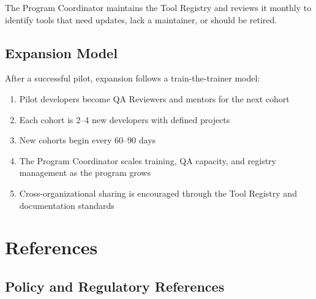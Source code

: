 \documentclass[11pt,letterpaper]{article}
\begin{document}
The Program Coordinator maintains the Tool Registry and reviews it monthly to identify
tools that need updates, lack a maintainer, or should be retired.

\subsection{Expansion Model}
\label{sec:expansion-model}

After a successful pilot, expansion follows a train-the-trainer model:

\begin{enumerate}
  \item Pilot developers become QA Reviewers and mentors for the next cohort
  \item Each cohort is 2--4 new developers with defined projects
  \item New cohorts begin every 60--90 days
  \item The Program Coordinator scales training, QA capacity, and registry management as the program grows
  \item Cross-organizational sharing is encouraged through the Tool Registry and documentation standards
\end{enumerate}

\section{References}
\label{sec:references}

\subsection{Policy and Regulatory References}
\end{document}
